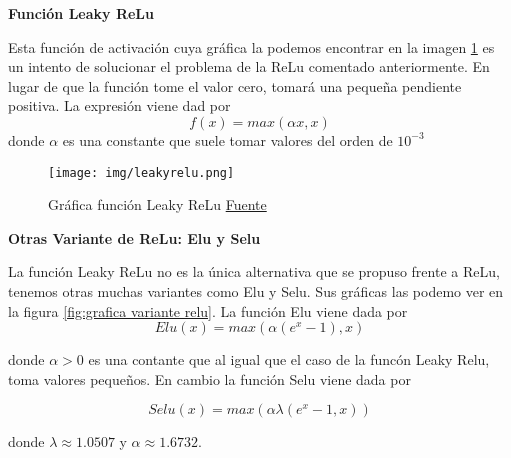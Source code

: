         
    \begin{center}
        \textbf{Función Leaky ReLu} \\
    \end{center}
    
        Esta función de activación cuya gráfica la podemos encontrar en la imagen \ref{fig:leakyrelu} es un intento de solucionar el problema de la ReLu comentado anteriormente. En lugar de que la función tome el valor cero, tomará una pequeña pendiente positiva. La expresión viene dad por
        \begin{equation}
            f(x) = max(\alpha x, x)
        \end{equation}
        \noindent donde $\alpha$ es una constante que suele tomar valores del orden de $10^{-3}$
        

        
        \begin{figure}[H]
            \centering
            \texttt{[image: img/leakyrelu.png]}
            \caption{Gráfica función Leaky ReLu \href{https://miro.medium.com/max/398/1*FDOyQlRurCK7mWU5i0Ly_w.png}{Fuente}}
            \label{fig:leakyrelu}
        \end{figure}
    
    \begin{center}
        \textbf{Otras Variante de ReLu: Elu y Selu} \\
    \end{center}
    
        La función Leaky ReLu no es la única alternativa que se propuso frente a ReLu, tenemos otras muchas variantes como Elu y Selu. Sus gráficas las podemo ver en la figura \ref{fig:grafica variante relu}. La función Elu viene dada por 
        \begin{equation}
            Elu(x) = max(\alpha(e^x -1),x)
        \end{equation}
        
        \noindent donde $\alpha > 0$ es una contante que al igual que el caso de la funcón Leaky Relu, toma valores pequeños. En cambio la función Selu viene dada por 
        
        \begin{equation}
            Selu(x) = max(\alpha \lambda(e^x - 1,x))
        \end{equation}
        
        \noindent donde $\lambda \approx 1.0507$ y $\alpha \approx 1.6732$. 

        
        
